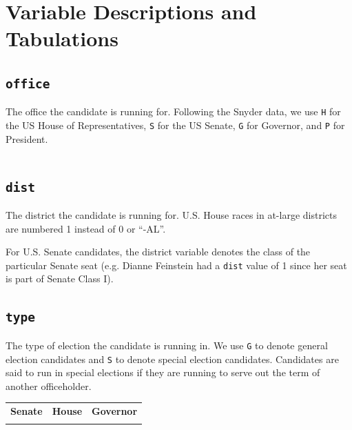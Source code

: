\documentclass[12pt]{article}
\begin{document}
\section{Variable Descriptions and Tabulations}



\subsection*{\texttt{office}}

The office the candidate is running for. Following the Snyder data, we use \texttt{H} for the US House of Representatives, \texttt{S} for the US Senate, \texttt{G} for Governor, and \texttt{P} for President.


    \begin{tabularx}{\linewidth}{C}
    
    \end{tabularx}

\subsection*{\texttt{dist}}

The district the candidate is running for. U.S. House races in at-large districts are numbered 1 instead of 0 or ``-AL''.

 For U.S. Senate candidates, the district variable denotes the class of the particular Senate seat (e.g. Dianne Feinstein had a \texttt{dist} value of 1 since her seat is part of Senate Class I).

\begin{table}[!h]
\centering
\footnotesize

\end{table}





\subsection*{\texttt{type}}

The type of election the candidate is running in. We use \texttt{G} to denote general election candidates and \texttt{S} to denote special election candidates. Candidates are said to run in special elections if they are running to serve out the term of another officeholder.
\begin{table}[!h]
\begin{tabularx}{\linewidth}{CCC}
    \textbf{Senate} & \textbf{House} & \textbf{Governor}\\
     &  & 
\end{tabularx}
\end{table}
\end{document}
